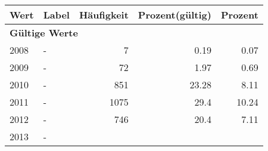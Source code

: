      \begin{longtable}{lXrrr}
     \toprule
     \textbf{Wert} & \textbf{Label} & \textbf{Häufigkeit} & \textbf{Prozent(gültig)} & \textbf{Prozent} \\
     \endhead
     \midrule
     \multicolumn{5}{l}{\textbf{Gültige Werte}}\\

     2008 &
     \multicolumn{1}{X}{ -  } &


       \num{7} &
       \num[round-mode=places,round-precision=2]{0,19} &
         \num[round-mode=places,round-precision=2]{0,07} \\

     2009 &
     \multicolumn{1}{X}{ -  } &


       \num{72} &
       \num[round-mode=places,round-precision=2]{1,97} &
         \num[round-mode=places,round-precision=2]{0,69} \\

     2010 &
     \multicolumn{1}{X}{ -  } &


       \num{851} &
       \num[round-mode=places,round-precision=2]{23,28} &
         \num[round-mode=places,round-precision=2]{8,11} \\

     2011 &
     \multicolumn{1}{X}{ -  } &


       \num{1075} &
       \num[round-mode=places,round-precision=2]{29,4} &
         \num[round-mode=places,round-precision=2]{10,24} \\

     2012 &
     \multicolumn{1}{X}{ -  } &


       \num{746} &
       \num[round-mode=places,round-precision=2]{20,4} &
         \num[round-mode=places,round-precision=2]{7,11} \\

     2013 &
     \multicolumn{1}{X}{ -  } &



\end{longtable}
